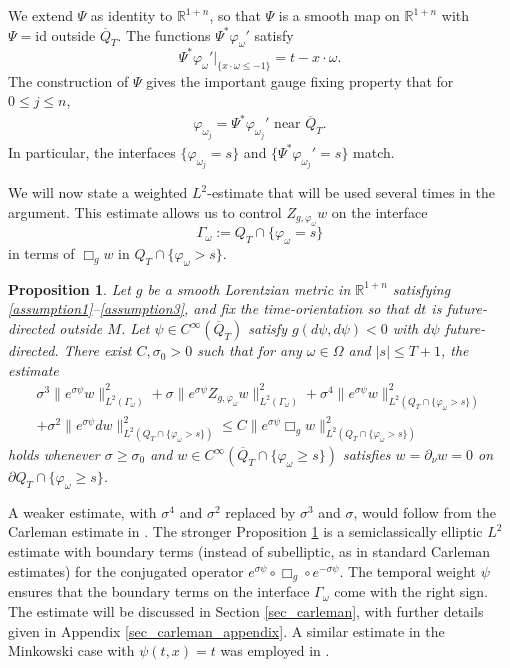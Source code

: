 \documentclass[11pt,letterpaper]{amsart}
\newtheorem{Proposition}[Theorem]{Proposition}
\theoremstyle{definition}
\numberwithin{equation}{section}
\newcommand{\mR}{\mathbb{R}}                    %
\newcommand{\norm}[1]{\lVert #1 \rVert}         %
\newcommand{\ol}[1]{\overline{#1}}
\newcommand{\id}{\mathrm{id}}
\newcommand{\p}{\partial}
\def\p{\partial}
\begin{document}
We extend $\Psi$ as identity to $\mR^{1+n}$, so that $\Psi$ is a smooth map on $\mR^{1+n}$ with $\Psi = \id$ outside $\ol{Q}_T$. The functions $\Psi^* \varphi_{\omega}'$ satisfy 
\[
\Psi^* \varphi_{\omega}'|_{\{ x \cdot \omega \leq -1 \}} = t - x \cdot \omega.
\]
The construction of $\Psi$ gives the important gauge fixing property that for $0 \leq j \leq n$, 
    \begin{align}\label{phi_omega_j}
\varphi_{\omega_j} = \Psi^* \varphi_{\omega_j}' \text{ near $\ol{Q}_T$.}
    \end{align}
In particular, the interfaces $\{ \varphi_{\omega_j} = s \}$ and $\{ \Psi^* \varphi_{\omega_j}' = s \}$ match.

We will now state a weighted $L^2$-estimate that will be used several times in the argument. This estimate allows us to control $Z_{g,\varphi_{\omega}} w$ on the interface 
\[
\Gamma_{\omega} := Q_T \cap \{ \varphi_{\omega} = s \}
\]
in terms of $\Box_g w$ in $Q_T \cap \{ \varphi_{\omega} > s \}$.

\begin{Proposition} \label{prop_carleman_psi}
Let $g$ be a smooth Lorentzian metric in $\mR^{1+n}$ satisfying \eqref{assumption1}--\eqref{assumption3}, and 
fix the time-orientation so that $dt$ is future-directed outside $M$.
Let $\psi \in C^{\infty}(\ol{Q}_T)$ satisfy $g(d\psi, d\psi) < 0$ with $d\psi$ future-directed. There exist $C, \sigma_0 > 0$ such that for any $\omega \in \Omega$ and $|s| \leq T+1$, the estimate 
\begin{multline*}
\sigma^3 \norm{e^{\sigma \psi} w}_{L^2(\Gamma_{\omega})}^2 + \sigma \norm{e^{\sigma \psi} Z_{g,\varphi_{\omega}} w}_{L^2(\Gamma_{\omega})}^2  + \sigma^4 \norm{e^{\sigma \psi} w}_{L^2(Q_T \cap \{ \varphi_{\omega} > s \})}^2 \\
  + \sigma^2 \norm{e^{\sigma \psi} d w}_{L^2(Q_T \cap \{ \varphi_{\omega} > s \})}^2 \leq C \norm{e^{\sigma \psi} \Box_g w}_{L^2(Q_T \cap \{ \varphi_{\omega} > s \})}^2
\end{multline*}
holds whenever $\sigma \geq \sigma_0$ and $w \in C^{\infty}(\ol{Q}_T \cap \{ \varphi_{\omega} \geq s \})$ satisfies $w = \partial_{\nu} w = 0$ on $\p Q_T \cap \{ \varphi_{\omega} \geq s \}$.
\end{Proposition}

A weaker estimate, with $\sigma^4$ and $\sigma^2$ replaced by $\sigma^3$ and $\sigma$, would follow from the Carleman estimate in \cite{rakesh2020a}. The stronger Proposition \ref{prop_carleman_psi} is a semiclassically elliptic $L^2$ estimate with boundary terms (instead of subelliptic, as in standard Carleman estimates) for the conjugated operator $e^{\sigma \psi} \circ \Box_g \circ e^{-\sigma \psi}$. The temporal weight $\psi$ ensures that the boundary terms on the interface $\Gamma_{\omega}$ come with the right sign. The estimate will be discussed in Section \ref{sec_carleman}, with further details given in Appendix \ref{sec_carleman_appendix}. A similar estimate in the Minkowski case with $\psi(t,x) = t$ was employed in \cite{krishnan2023}.
\end{document}

